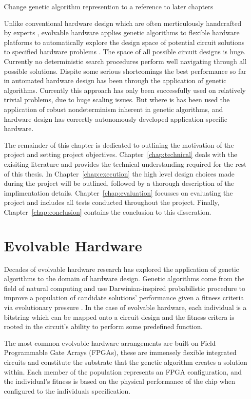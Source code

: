\todo Change genetic algorithm represention to a reference to later chapters

Unlike conventional hardware design which are often merticulously handcrafted
by experts , evolvable hardware applies genetic algorithms to
flexible hardware platforms to automatically explore the design space of potential
circuit solutions to specified hardware problems \cite{541893}.
The space of all possible circuit designs is huge. Currently no deterministic
search procedures perform well navigating through all possible solutions.
Dispite some serious shortcomings the best performance so far in automated
hardware design has been through the application of genetic algorithms.
Currently this approach has only been successfully used on relatively
trivial problems, due to huge scaling issues. But where is has been used
the application of
robust nondeterminism inherent in genetic algorithms, and hardware design
has correctly autonomously developed application specific hardware.

The remainder of this chapter is dedicated to outlining the motivation of the
project and setting project objectives. Chapter~\ref{chap:technical} deals with
the exisiting literature and provides the technical understanding required for the
rest of this thesis. In Chapter~\ref{chap:execution} the high level design choices
made during the project will be outlined, followed by a thorough description of
the implimentation details. Chapter~\ref{chap:evaluation} focusses on evaluating
the project and includes all tests conducted throughout the project. Finally,
Chapter~\ref{chap:conclusion} contains the conclusion to this disseration.

\section{Evolvable Hardware}
Decades of evolvable hardware research has explored the application of genetic algorithms to
the domain of hardware design. Genetic algorithms come from the field of natural
computing and use Darwinian-inspired probabilistic procedure to improve a population
of candidate solutions'
performance given a fitness criteria via evolutionary pressure \cite{Goldberg:1989:GAS:534133}.
In the case of evolvable hardware,
each individual is a bitstring which can be mapped onto a circuit design
and the fitness critera is rooted
in the circuit's ability to perform some predefined function.

The most common evolvable hardware arrangements
are built on Field Programmable Gate Arrays (FPGAs), these are immensely
flexible integrated circuits and constitute the substrate that the genetic
algorithm creates a solution within. Each member of the population
represents an FPGA configuration, and the individual's fitness is based on the
physical performance of the chip when configured to the individuals specification.

